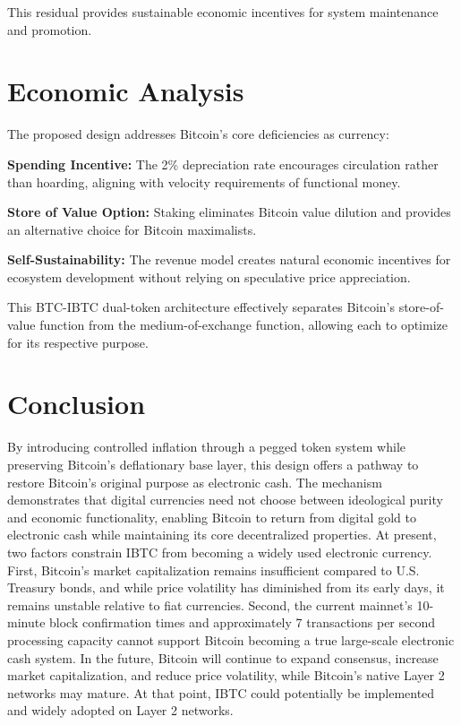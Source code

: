 \documentclass[11pt]{article}
\begin{document}
This residual provides sustainable economic incentives for system maintenance and promotion.

\section{Economic Analysis}

The proposed design addresses Bitcoin's core deficiencies as currency:

\textbf{Spending Incentive:} The 2\% depreciation rate encourages circulation rather than hoarding, aligning with velocity requirements of functional money.

\textbf{Store of Value Option:} Staking eliminates Bitcoin value dilution and provides an alternative choice for Bitcoin maximalists.

\textbf{Self-Sustainability:} The revenue model creates natural economic incentives for ecosystem development without relying on speculative price appreciation.

This BTC-IBTC dual-token architecture effectively separates Bitcoin's store-of-value function from the medium-of-exchange function, allowing each to optimize for its respective purpose.

\section{Conclusion}

By introducing controlled inflation through a pegged token system while preserving Bitcoin's deflationary base layer, this design offers a pathway to restore Bitcoin's original purpose as electronic cash. The mechanism demonstrates that digital currencies need not choose between ideological purity and economic functionality, enabling Bitcoin to return from digital gold to electronic cash while maintaining its core decentralized properties. At present, two factors constrain IBTC from becoming a widely used electronic currency. First, Bitcoin's market capitalization remains insufficient compared to U.S. Treasury bonds, and while price volatility has diminished from its early days, it remains unstable relative to fiat currencies. Second, the current mainnet's 10-minute block confirmation times and approximately 7 transactions per second processing capacity cannot support Bitcoin becoming a true large-scale electronic cash system. In the future, Bitcoin will continue to expand consensus, increase market capitalization, and reduce price volatility, while Bitcoin's native Layer 2 networks may mature. At that point, IBTC could potentially be implemented and widely adopted on Layer 2 networks.
\end{document}
